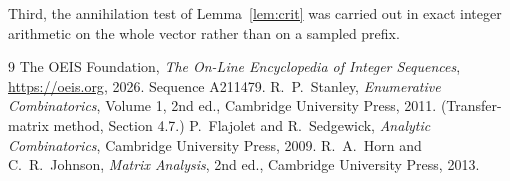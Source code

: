 \documentclass[11pt,a4paper]{article}
\theoremstyle{plain}
\theoremstyle{definition}
\begin{document}
Third, the annihilation test of Lemma~\ref{lem:crit} was carried out in exact integer
arithmetic on the whole vector rather than on a sampled prefix.

\begin{thebibliography}{9}
 The OEIS Foundation, \emph{The On-Line Encyclopedia of Integer
Sequences}, \url{https://oeis.org}, 2026. Sequence A211479.
 R.~P.~Stanley, \emph{Enumerative Combinatorics}, Volume 1, 2nd ed.,
Cambridge University Press, 2011. (Transfer-matrix method, Section 4.7.)
 P.~Flajolet and R.~Sedgewick, \emph{Analytic Combinatorics}, Cambridge
University Press, 2009.
 R.~A.~Horn and C.~R.~Johnson, \emph{Matrix Analysis}, 2nd ed., Cambridge
University Press, 2013.
\end{thebibliography}
\end{document}
